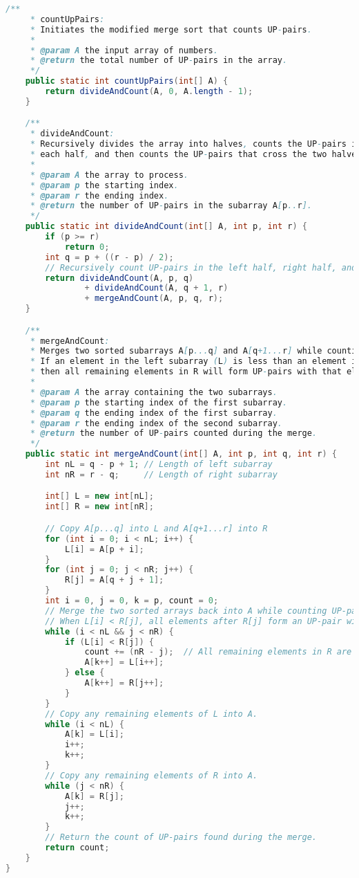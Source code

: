 \documentclass[11pt]{article}
\begin{document}
\begin{lstlisting}[language=Java]
    /**
     * countUpPairs:
     * Initiates the modified merge sort that counts UP-pairs.
     *
     * @param A the input array of numbers.
     * @return the total number of UP-pairs in the array.
     */
    public static int countUpPairs(int[] A) {
        return divideAndCount(A, 0, A.length - 1);
    }

    /**
     * divideAndCount:
     * Recursively divides the array into halves, counts the UP-pairs in
     * each half, and then counts the UP-pairs that cross the two halves during the merge.
     *
     * @param A the array to process.
     * @param p the starting index.
     * @param r the ending index.
     * @return the number of UP-pairs in the subarray A[p..r].
     */
    public static int divideAndCount(int[] A, int p, int r) {
        if (p >= r)
            return 0;
        int q = p + ((r - p) / 2);
        // Recursively count UP-pairs in the left half, right half, and across the halves.
        return divideAndCount(A, p, q)
                + divideAndCount(A, q + 1, r)
                + mergeAndCount(A, p, q, r);
    }

    /**
     * mergeAndCount:
     * Merges two sorted subarrays A[p...q] and A[q+1...r] while counting UP-pairs.
     * If an element in the left subarray (L) is less than an element in the right subarray (R),
     * then all remaining elements in R will form UP-pairs with that element from L.
     *
     * @param A the array containing the two subarrays.
     * @param p the starting index of the first subarray.
     * @param q the ending index of the first subarray.
     * @param r the ending index of the second subarray.
     * @return the number of UP-pairs counted during the merge.
     */
    public static int mergeAndCount(int[] A, int p, int q, int r) {
        int nL = q - p + 1; // Length of left subarray
        int nR = r - q;     // Length of right subarray

        int[] L = new int[nL];
        int[] R = new int[nR];

        // Copy A[p...q] into L and A[q+1...r] into R
        for (int i = 0; i < nL; i++) {
            L[i] = A[p + i];
        }
        for (int j = 0; j < nR; j++) {
            R[j] = A[q + j + 1];
        }
        int i = 0, j = 0, k = p, count = 0;
        // Merge the two sorted arrays back into A while counting UP-pairs.
        // When L[i] < R[j], all elements after R[j] form an UP-pair with L[i].
        while (i < nL && j < nR) {
            if (L[i] < R[j]) {
                count += (nR - j);  // All remaining elements in R are greater than L[i]
                A[k++] = L[i++];
            } else {
                A[k++] = R[j++];
            }
        }
        // Copy any remaining elements of L into A.
        while (i < nL) {
            A[k] = L[i];
            i++;
            k++;
        }
        // Copy any remaining elements of R into A.
        while (j < nR) {
            A[k] = R[j];
            j++;
            k++;
        }
        // Return the count of UP-pairs found during the merge.
        return count;
    }
}
\end{lstlisting}
\pagebreak
\end{document}
